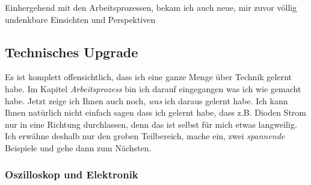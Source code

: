 \documentclass[12pt,titlepage,a4paper]{article}
\begin{document}
Einhergehend mit den Arbeitsprozessen, bekam ich auch neue, mir zuvor völlig undenkbare Einsichten und Perspektiven 
\subsection{Technisches Upgrade}
Es ist komplett offensichtlich, dass ich eine ganze Menge über Technik gelernt habe. Im Kapitel \textit{Arbeitsprozess} bin ich darauf eingegangen was ich wie gemacht habe. Jetzt zeige ich Ihnen auch noch, \textit{was} ich daraus gelernt habe. Ich kann Ihnen natürlich nicht einfach sagen dass ich gelernt habe, dass z.B. Dioden Strom nur in eine Richtung durchlassen, denn das ist selbst für mich etwas langweilig. Ich erwähne deshalb nur den groben Teilbereich, mache ein, zwei \textit{spannende} Beispiele und gehe dann zum Nächsten.
\subsubsection{Oszilloskop und Elektronik}
\end{document}
